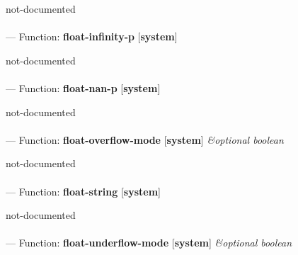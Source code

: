 \begin{adjustwidth}{5em}{5em}
not-documented
\end{adjustwidth}

\paragraph{}
\label{SYSTEM:FLOAT-INFINITY-P}
--- Function: \textbf{float-infinity-p} [\textbf{system}] \textit{}

\begin{adjustwidth}{5em}{5em}
not-documented
\end{adjustwidth}

\paragraph{}
\label{SYSTEM:FLOAT-NAN-P}
--- Function: \textbf{float-nan-p} [\textbf{system}] \textit{}

\begin{adjustwidth}{5em}{5em}
not-documented
\end{adjustwidth}

\paragraph{}
\label{SYSTEM:FLOAT-OVERFLOW-MODE}
--- Function: \textbf{float-overflow-mode} [\textbf{system}] \textit{\&optional boolean}

\begin{adjustwidth}{5em}{5em}
not-documented
\end{adjustwidth}

\paragraph{}
\label{SYSTEM:FLOAT-STRING}
--- Function: \textbf{float-string} [\textbf{system}] \textit{}

\begin{adjustwidth}{5em}{5em}
not-documented
\end{adjustwidth}

\paragraph{}
\label{SYSTEM:FLOAT-UNDERFLOW-MODE}
--- Function: \textbf{float-underflow-mode} [\textbf{system}] \textit{\&optional boolean}

